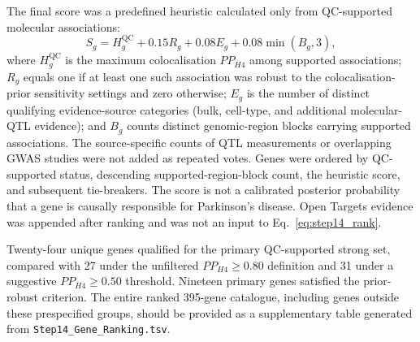 \documentclass[11pt,a4paper]{article}
\begin{document}
The final score was a predefined heuristic calculated only from QC-supported molecular associations:
\begin{equation}
S_g = H^{\mathrm{QC}}_g + 0.15R_g + 0.08 E_g + 0.08\min(B_g,3),
\label{eq:step14_rank}
\end{equation}
where $H^{\mathrm{QC}}_g$ is the maximum colocalisation $PP_{H4}$ among supported associations; $R_g$ equals one if at least one such association was robust to the colocalisation-prior sensitivity settings and zero otherwise; $E_g$ is the number of distinct qualifying evidence-source categories (bulk, cell-type, and additional molecular-QTL evidence); and $B_g$ counts distinct genomic-region blocks carrying supported associations. The source-specific counts of QTL measurements or overlapping GWAS studies were not added as repeated votes. Genes were ordered by QC-supported status, descending supported-region-block count, the heuristic score, and subsequent tie-breakers. The score is not a calibrated posterior probability that a gene is causally responsible for Parkinson's disease. Open Targets evidence was appended after ranking and was not an input to Eq.~\ref{eq:step14_rank}.

Twenty-four unique genes qualified for the primary QC-supported strong set, compared with 27 under the unfiltered $PP_{H4}\geq0.80$ definition and 31 under a suggestive $PP_{H4}\geq0.50$ threshold. Nineteen primary genes satisfied the prior-robust criterion. The entire ranked 395-gene catalogue, including genes outside these prespecified groups, should be provided as a supplementary table generated from \texttt{Step14\_Gene\_Ranking.tsv}.
\end{document}
